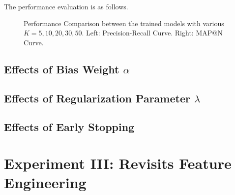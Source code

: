 \documentclass{article} %
\begin{document}
The performance evaluation is as follows.
\begin{figure}[hp]
    \centering
    \captionsetup{justification=centering}
    \caption{Performance Comparison between the trained models with various
        $K=5,10,20,30,50$.  Left: Precision-Recall Curve. Right: MAP@N Curve. }
    \label{EffectK:RP_MAP}
\end{figure}

\subsection{Effects of Bias Weight $\alpha$}

\subsection{Effects of Regularization Parameter $\lambda$}

\subsection{Effects of Early Stopping}


\section{Experiment III: Revisits Feature Engineering}
\end{document}

